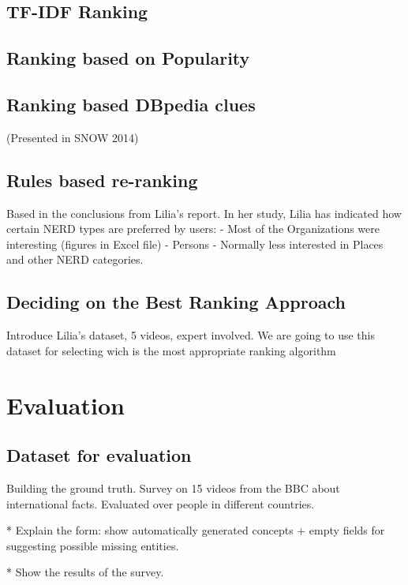\documentclass{llncs}
\begin{document}
\subsection{TF-IDF  Ranking}

\subsection{Ranking based on Popularity}

\subsection{Ranking based DBpedia clues}
(Presented in SNOW 2014)

\subsection{Rules based re-ranking}
Based in the conclusions from Lilia's report. In her study, Lilia has indicated how certain NERD types are preferred by users:
- Most of the Organizations were interesting (figures in Excel file)
- Persons 
- Normally less interested in Places and other NERD categories.

\subsection{Deciding on the Best Ranking Approach}
\label{sec:decidingRanking}
Introduce Lilia's dataset, 5 videos, expert involved. We are going to use this dataset for selecting wich is the most appropriate ranking algorithm


\section{Evaluation}
\label{sec:Evaluation}

\subsection{Dataset for evaluation}
Building the ground truth. Survey on 15 videos from the BBC about international facts. Evaluated over people in different countries.

* Explain the form: show automatically generated concepts + empty fields for suggesting possible missing entities.

* Show the results of the survey.
\end{document}

